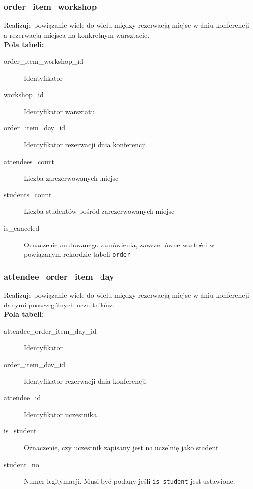 \documentclass[12pt]{article}
\begin{document}


\subsubsection{order\_item\_workshop}
Realizuje powiązanie wiele do wielu między rezerwacją miejsc w dniu konferencji a rezerwacją miejsca na konkretnym warsztacie. \\

\textbf{Pola tabeli:}
\begin{description}
\item [order\_item\_workshop\_id] Identyfikator
\item [workshop\_id] Identyfikator warsztatu
\item [order\_item\_day\_id] Identyfikator rezerwacji dnia konferencji
\item [attendees\_count] Liczba zarezerwowanych miejsc
\item [students\_count] Liczba studentów pośród zarezerwowanych miejsc
\item [is\_canceled] Oznaczenie anulowanego zamówienia, zawsze równe wartości w powiązanym rekordzie tabeli \texttt{order}
\end{description}


\subsubsection{attendee\_order\_item\_day}
Realizuje powiązanie wiele do wielu między rezerwacją miejsc w dniu konferencji danymi poszczególnych uczestników. \\


\textbf{Pola tabeli:}
\begin{description}
\item [attendee\_order\_item\_day\_id] Identyfikator
\item [order\_item\_day\_id] Identyfikator rezerwacji dnia konferencji
\item [attendee\_id] Identyfikator uczestnika
\item [is\_student] Oznaczenie, czy uczestnik zapisany jest na uczelnię jako student
\item [student\_no] Numer legitymacji. Musi być podany jeśli \texttt{is\_student} jest ustawione.
\end{description}


\end{document}
